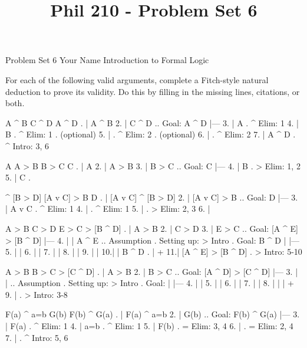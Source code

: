 
\title{Phil 210 - Problem Set 6}

\heading
Problem Set 6
Your Name
Introduction to Formal Logic
\endheading

For each of the following valid arguments, complete a Fitch-style natural deduction to prove its validity. Do this by filling in the missing lines, citations, or both.

\problems
{}
\argument
 A ^ B
 C ^ D
\argumentline
 A ^ D
\endargument
	\answer
	. | A ^ B
	 2. | C ^ D  ..  Goal: A ^ D
	    |---
	 3. | A      .  ^ Elim: 1
	 4. | B      .  ^ Elim: 1  .  (optional)
	 5. |        .  ^ Elim: 2  .  (optional)
	 6. |        .  ^ Elim: 2
	 7. | A ^ D  .  ^ Intro: 3, 6
	\endfitchproof
	\endanswer

\argument
 A
 A > B
 B > C
\argumentline
 C
\endargument
	\answer
	. | A
	 2. | A > B
	 3. | B > C  ..  Goal: C
	    |---
	 4. | B      .  > Elim: 1, 2
	 5. | C      .  
	\endfitchproof
	\endanswer

\argument
 [A v C] ^ [B > D]
 [A v C] > B
\argumentline
 D
\endargument
	\answer
	. | [A v C] ^ [B > D]
	 2. | [A v C] > B        ..  Goal: D
	    |---
	 3. | A v C              .  ^ Elim: 1
	 4. |                    .  ^ Elim: 1
	 5. |                    .  > Elim: 2, 3
	 6. | 
	\endfitchproof
	\endanswer

\argument
 A > B
 C > D
 E > C
\argumentline
 [A ^ E] > [B ^ D]
\endargument
	\answer
	. | A > B
	 2. | C > D
	 3. | E > C      ..  Goal: [A ^ E] > [B ^ D]
	    |---
	 4. |   | A ^ E  ..  Assumption  .  Setting up: > Intro  .  Goal: B ^ D
	    |   |---
	 5. |   | 
	 6. |   | 
	 7. |   | 
	 8. |   | 
	 9. |   | 
	 10.|   | B ^ D   .  
	    |   +
	 11.| [A ^ E] > [B ^ D]  .  > Intro: 5-10
	\endfitchproof
	\endanswer

\argument
 A > B
 B > C
\argumentline
 [A ^ D] > [C ^ D]
\endargument
	\answer
	. | A > B
	 2. | B > C      ..  Goal: [A ^ D] > [C ^ D]
	    |---
	 3. |   |        ..  Assumption  .  Setting up: > Intro  .  Goal: 
	    |   |---
	 4. |   | 
	 5. |   | 
	 6. |   | 
	 7. |   | 
	 8. |   | 
	    |   +
	 9. |            .  > Intro: 3-8
	\endfitchproof
	\endanswer

\argument
 F(a) ^ a=b
 G(b)
\argumentline
 F(b) ^ G(a)
\endargument
	\answer
	. | F(a) ^ a=b
	 2. | G(b)         ..  Goal: F(b) ^ G(a)
	    |---
	 3. | F(a)         .  ^ Elim: 1
	 4. | a=b          .  ^ Elim: 1
	 5. | F(b)         .  = Elim: 3, 4
	 6. |              .  = Elim: 2, 4
	 7. |              .  ^ Intro: 5, 6
	\endfitchproof
	\endanswer

